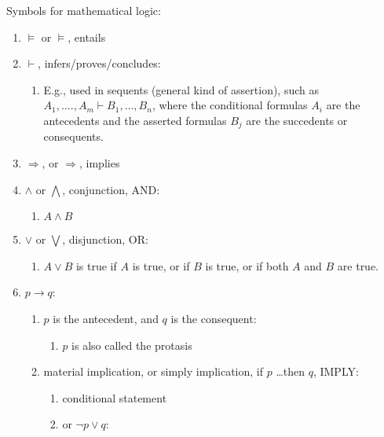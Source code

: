 Symbols for mathematical logic: \vspace{-0.3cm}
\begin{enumerate} \itemsep -4pt
\item $\models$ or $\vDash$, entails
\item $\vdash$, infers/proves/concludes: \vspace{-0.3cm}
	\begin{enumerate} \itemsep -2pt
	\item E.g., used in sequents (general kind of assertion), such as $A_{1}, \dots., A_{m} \vdash B_{1}, \dots, B_{n}$, where the conditional formulas $A_{i}$ are the antecedents and the asserted formulas $B_{j}$ are the succedents or consequents.
	\end{enumerate}
\item $\Rightarrow$, or $\Longrightarrow$, implies
\item $\land$ or $\bigwedge$, conjunction, AND: \vspace{-0.3cm}
	\begin{enumerate} \itemsep -2pt
	\item $A\land B$
	\end{enumerate}
\item $\lor$ or $\bigvee$, disjunction, OR: \vspace{-0.3cm}
	\begin{enumerate} \itemsep -2pt
	\item $A\lor B$ is true if ${\displaystyle A}$ is true, or if ${\displaystyle B}$ is true, or if both ${\displaystyle A}$ and ${\displaystyle B}$ are true.
	\end{enumerate}
\item $p \rightarrow q$: \vspace{-0.3cm}
	\begin{enumerate} \itemsep -2pt
	\item $p$ is the antecedent, and $q$ is the consequent: \vspace{-0.2cm}
		\begin{enumerate} \itemsep -2pt
		\item $p$ is also called the protasis
		\end{enumerate}
	\item material implication, or simply implication, if $p$ \dots then $q$, IMPLY: \vspace{-0.2cm}
		\begin{enumerate} \itemsep -2pt
		\item conditional statement
		\item or $\neg p \lor q$: \vspace{-0.1cm}

\end{enumerate}
\end{enumerate}
\end{enumerate}

